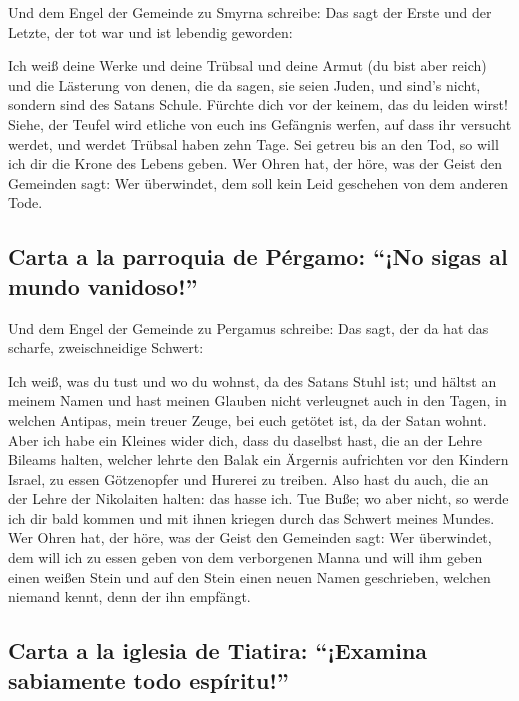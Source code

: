  Und dem Engel der Gemeinde zu Smyrna schreibe: Das sagt
der Erste und der Letzte, der tot war und ist lebendig geworden:

 Ich weiß deine Werke und deine Trübsal und deine Armut
(du bist aber reich) und die Lästerung von denen, die da sagen, sie
seien Juden, und sind's nicht, sondern sind des Satans Schule.
 Fürchte dich vor der keinem, das du leiden wirst! Siehe,
der Teufel wird etliche von euch ins Gefängnis werfen, auf dass ihr
versucht werdet, und werdet Trübsal haben zehn Tage. Sei getreu bis an
den Tod, so will ich dir die Krone des Lebens geben.  Wer
Ohren hat, der höre, was der Geist den Gemeinden sagt: Wer überwindet,
dem soll kein Leid geschehen von dem anderen Tode.

\hypertarget{carta-a-la-parroquia-de-puxe9rgamo-no-sigas-al-mundo-vanidoso}{%
\subsection{Carta a la parroquia de Pérgamo: ``¡No sigas al mundo
vanidoso!''}\label{carta-a-la-parroquia-de-puxe9rgamo-no-sigas-al-mundo-vanidoso}}

 Und dem Engel der Gemeinde zu Pergamus schreibe: Das
sagt, der da hat das scharfe, zweischneidige Schwert:

 Ich weiß, was du tust und wo du wohnst, da des Satans
Stuhl ist; und hältst an meinem Namen und hast meinen Glauben nicht
verleugnet auch in den Tagen, in welchen Antipas, mein treuer Zeuge, bei
euch getötet ist, da der Satan wohnt.  Aber ich habe ein
Kleines wider dich, dass du daselbst hast, die an der Lehre Bileams
halten, welcher lehrte den Balak ein Ärgernis aufrichten vor den Kindern
Israel, zu essen Götzenopfer und Hurerei zu treiben. 
Also hast du auch, die an der Lehre der Nikolaiten halten: das hasse
ich.  Tue Buße; wo aber nicht, so werde ich dir bald
kommen und mit ihnen kriegen durch das Schwert meines Mundes.
 Wer Ohren hat, der höre, was der Geist den Gemeinden
sagt: Wer überwindet, dem will ich zu essen geben von dem verborgenen
Manna und will ihm geben einen weißen Stein und auf den Stein einen
neuen Namen geschrieben, welchen niemand kennt, denn der ihn empfängt.

\hypertarget{carta-a-la-iglesia-de-tiatira-examina-sabiamente-todo-espuxedritu}{%
\subsection{Carta a la iglesia de Tiatira: ``¡Examina sabiamente todo
espíritu!''}\label{carta-a-la-iglesia-de-tiatira-examina-sabiamente-todo-espuxedritu}}

